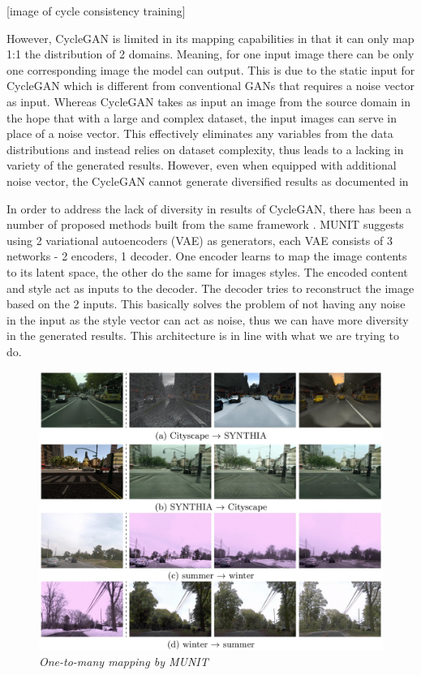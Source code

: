 \documentclass[12pt]{report}
\begin{document}
[image of cycle consistency training]

However, CycleGAN is limited in its mapping capabilities in that it can only map 1:1 the distribution of 2 domains. Meaning, for one input image there can be only one corresponding image the model can output. This is due to the static input for CycleGAN which is different from conventional GANs that requires a noise vector as input. Whereas CycleGAN takes as input an image from the source domain in the hope that with a large and complex dataset, the input images can serve in place of a noise vector. This effectively eliminates any variables from the data distributions and instead relies on dataset complexity, thus leads to a lacking in variety of the generated results. However, even when equipped with additional noise vector, the CycleGAN cannot generate diversified results as documented in \cite{augmented-cyclegan} 

In order to address the lack of diversity in results of CycleGAN, there has been a number of proposed methods built from the same framework \cite{munit}\cite{bicycle-gan}\cite{disco-gan}\cite{bayesian-cyclegan}. MUNIT\cite{munit} suggests using 2 variational autoencoders (VAE) as generators, each VAE consists of 3 networks - 2 encoders, 1 decoder. One encoder learns to map the image contents to its latent space, the other do the same for images styles. The encoded content and style act as inputs to the decoder. The decoder tries to reconstruct the image based on the 2 inputs. This basically solves the problem of not having any noise in the input as the style vector can act as noise, thus we can have more diversity in the generated results. This architecture is in line with what we are trying to do.

\begin{figure}[h]
	\centering
	\includegraphics[scale=0.2]{street-munit}
	\caption{\textit{One-to-many mapping by MUNIT\cite{munit}}}
	\label{fig:street-munit}
\end{figure}
\end{document}
